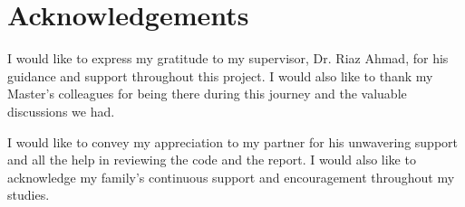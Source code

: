 \chapter*{Acknowledgements} 

I would like to express my gratitude to my supervisor, Dr. Riaz Ahmad, for his guidance and support throughout this project. I would also like to thank my Master's colleagues for being there during this journey and the valuable discussions we had.

I would like to convey my appreciation to my partner for his unwavering support and all the help in reviewing the code and the report. I would also like to acknowledge my family's continuous support and encouragement throughout my studies.